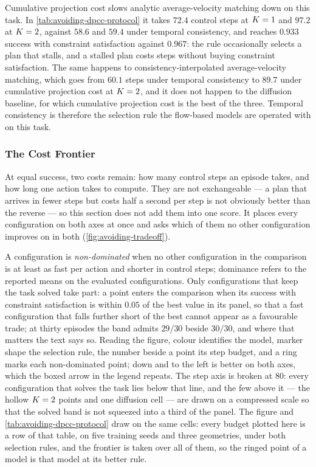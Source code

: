 Cumulative projection cost slows analytic average-velocity matching down on this task. In
\autoref{tab:avoiding-dpcc-protocol} it takes $72.4$ control steps at $K=1$ and $97.2$ at $K=2$,
against $58.6$ and $59.4$ under temporal consistency, and reaches $0.933$ success with constraint
satisfaction against $0.967$: the rule occasionally selects a plan that stalls, and a stalled plan costs
steps without buying constraint satisfaction. The same happens to consistency-interpolated
average-velocity matching, which goes from $60.1$ steps under temporal consistency to $89.7$ under
cumulative projection cost at $K=2$, and it does not happen to the diffusion baseline, for which
cumulative projection cost is the best of the three. Temporal consistency is therefore the selection rule
the flow-based models are operated with on this task.

\subsubsection{The Cost Frontier}\label{sec:res:avoiding:pareto}

At equal success, two costs remain: how many control steps an episode takes, and how long one action takes
to compute. They are not exchangeable --- a plan that arrives in fewer steps but costs half a second per
step is not obviously better than the reverse --- so this section does not add them into one score. It
places every configuration on both axes at once and asks which of them no other configuration improves on in both
(\autoref{fig:avoiding-tradeoff}).

A configuration is \emph{non-dominated} when no other configuration in the comparison is at least as fast per
action and shorter in control steps; dominance refers to the reported means on the evaluated configurations. Only configurations that keep the task solved take part:
a point enters the comparison when its success with constraint satisfaction is within $0.05$ of the best
value in its panel, so that a fast configuration that falls further short of the best cannot appear as a
favourable trade; at thirty episodes the band admits $29/30$ beside $30/30$, and where that matters the text
says so. Reading the figure, colour identifies the model, marker shape the selection rule, the
number beside a point its step budget, and a ring marks each non-dominated point; down and to the left is
better on both axes, which the boxed arrow in the legend repeats. The step axis is broken at $80$: every
configuration that solves the task lies below that line, and the few above it --- the hollow $K=2$
points and one diffusion cell --- are drawn on a compressed scale so that the solved band is not squeezed
into a third of the panel. The figure and
\autoref{tab:avoiding-dpcc-protocol} draw on the same cells: every budget plotted here is a row of that
table, on five training seeds and three geometries, under both selection rules, and the frontier is taken
over all of them, so the ringed point of a model is that model at its better rule.

